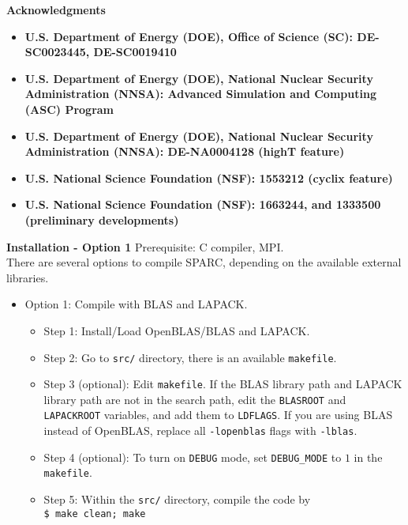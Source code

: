   
  \begin{frame}[allowframebreaks]{\textbf{Acknowledgments}} \label{Acknowledgments}
  
  \begin{itemize}
      \item \textbf{U.S. Department of Energy (DOE), Office of Science (SC): DE-SC0023445, DE-SC0019410} \\

       \item \textbf{U.S. Department of Energy (DOE), National Nuclear Security Administration (NNSA): Advanced Simulation and Computing (ASC) Program} \\

        \item \textbf{U.S. Department of Energy (DOE), National Nuclear Security Administration (NNSA): DE-NA0004128 (highT feature)} \\

        \item \textbf{U.S. National Science Foundation (NSF): 1553212 (cyclix feature)
        } \\

        \item \textbf{U.S. National Science Foundation (NSF): 1663244, and 1333500 (preliminary developments)} \\
  \end{itemize}
  
  \end{frame}
  
  \begin{frame}{\textbf{Installation - Option 1}} \label{Installation:1}
  Prerequisite: C compiler, MPI.\\
  There are several options to compile SPARC, depending on the available external libraries.
  \begin{itemize}
  \item Option 1: Compile with BLAS and LAPACK.
    \begin{itemize}
      \item Step 1: Install/Load OpenBLAS/BLAS and LAPACK.
      \item Step 2: Go to \texttt{src/} directory, there is an available \texttt{makefile}.
      \item Step 3 (optional): Edit \texttt{makefile}. If the BLAS library path and LAPACK library path are not in the search path, edit the \texttt{BLASROOT} and \texttt{LAPACKROOT} variables, and add them to \texttt{LDFLAGS}. If you are using BLAS instead of OpenBLAS, replace all \texttt{-lopenblas} flags with \texttt{-lblas}.
      \item Step 4 (optional): To turn on \texttt{DEBUG} mode, set \texttt{DEBUG\_MODE} to $1$ in the \texttt{makefile}.
      \item Step 5: Within the \texttt{src/} directory, compile the code by \\
            \texttt{\$ make clean; make}
    \end{itemize}
  \end{itemize}
  \end{frame}
  

